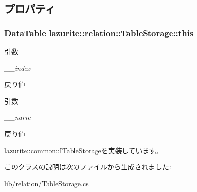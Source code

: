 \subsection{プロパティ}
\hypertarget{classlazurite_1_1relation_1_1_table_storage_aaf6dac4136fc070b9c173b4c8231089d}{
\subsubsection[{this}]{\setlength{\rightskip}{0pt plus 5cm}DataTable lazurite::relation::TableStorage::this}}
\label{classlazurite_1_1relation_1_1_table_storage_aaf6dac4136fc070b9c173b4c8231089d}

\begin{DoxyParams}{引数}
\item[{\em \_\-\_\-index}]\end{DoxyParams}
\begin{DoxyReturn}{戻り値}

\end{DoxyReturn}



\begin{DoxyParams}{引数}
\item[{\em \_\-\_\-name}]\end{DoxyParams}
\begin{DoxyReturn}{戻り値}

\end{DoxyReturn}


\hyperlink{interfacelazurite_1_1common_1_1_i_table_storage_adba59c2b0bb2d632fbc2ae087b6b63f3}{lazurite::common::ITableStorage}を実装しています。

このクラスの説明は次のファイルから生成されました:\begin{DoxyCompactItemize}
\item 
lib/relation/TableStorage.cs\end{DoxyCompactItemize}
